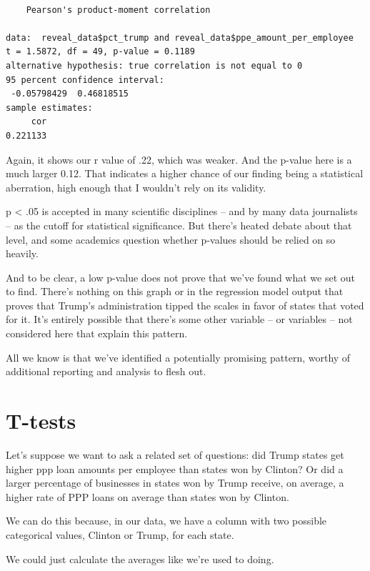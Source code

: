 \documentclass[
  letterpaper,
  DIV=11,
  numbers=noendperiod]{scrreprt}
\begin{document}
\begin{verbatim}

    Pearson's product-moment correlation

data:  reveal_data$pct_trump and reveal_data$ppe_amount_per_employee
t = 1.5872, df = 49, p-value = 0.1189
alternative hypothesis: true correlation is not equal to 0
95 percent confidence interval:
 -0.05798429  0.46818515
sample estimates:
     cor 
0.221133 
\end{verbatim}

Again, it shows our r value of .22, which was weaker. And the p-value
here is a much larger 0.12. That indicates a higher chance of our
finding being a statistical aberration, high enough that I wouldn't rely
on its validity.

p \textless{} .05 is accepted in many scientific disciplines -- and by
many data journalists -- as the cutoff for statistical significance. But
there's heated debate about that level, and some academics question
whether p-values should be relied on so heavily.

And to be clear, a low p-value does not prove that we've found what we
set out to find. There's nothing on this graph or in the regression
model output that proves that Trump's administration tipped the scales
in favor of states that voted for it. It's entirely possible that
there's some other variable -- or variables -- not considered here that
explain this pattern.

All we know is that we've identified a potentially promising pattern,
worthy of additional reporting and analysis to flesh out.


\hypertarget{t-tests}{%
\chapter{T-tests}\label{t-tests}}

Let's suppose we want to ask a related set of questions: did Trump
states get higher ppp loan amounts per employee than states won by
Clinton? Or did a larger percentage of businesses in states won by Trump
receive, on average, a higher rate of PPP loans on average than states
won by Clinton.

We can do this because, in our data, we have a column with two possible
categorical values, Clinton or Trump, for each state.

We could just calculate the averages like we're used to doing.
\end{document}

